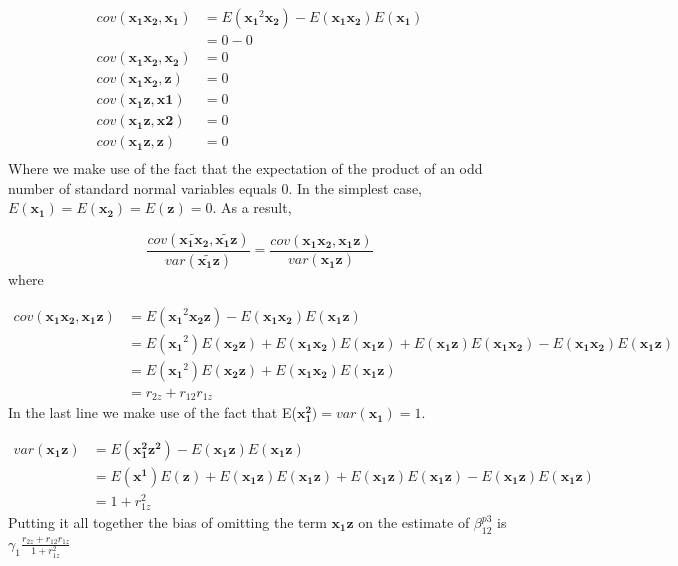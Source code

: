 \documentclass[12pt]{article}
\begin{document}
\begin{align*}
cov(\mathbf{x_1 x_2}, \mathbf{x_1}) &= E(\mathbf{x_1}^2 \mathbf{x_2}) - E(\mathbf{x_1 x_2}) E(\mathbf{x_1}) \\
&= 0 - 0 \\
cov(\mathbf{x_1 x_2}, \mathbf{x_2}) &= 0 \\
cov(\mathbf{x_1 x_2}, \mathbf{z}) &= 0 \\
cov(\mathbf{x_1 z}, \mathbf{x1}) &= 0 \\
cov(\mathbf{x_1 z}, \mathbf{x2}) &= 0 \\
cov(\mathbf{x_1 z}, \mathbf{z}) &= 0 \\
\end{align*}
Where we make use of the fact that the expectation of the product of an odd number of standard normal variables equals 0. In the simplest case, $E(\mathbf{x_1}) =  E(\mathbf{x_2}) = E(\mathbf{z}) = 0$.
As a result,

\begin{equation*}
\frac{cov(\widetilde{\mathbf{x_1 x_2}}, \widetilde{\mathbf{x_1 z}})}{var(\widetilde{\mathbf{x_1 z}})} =
\frac{cov(\mathbf{x_1 x_2}, \mathbf{x_1 z})}{var(\mathbf{x_1 z})} 
\end{equation*}
where 

\begin{align*}
cov(\mathbf{x_1 x_2}, \mathbf{x_1 z}) &= E(\mathbf{x_1}^2 \mathbf{x_2 z }) - E(\mathbf{x_1 x_2}) E(\mathbf{x_1 z}) \\
&= E(\mathbf{x_1}^2) E(\mathbf{x_2 z }) + E(\mathbf{x_1 x_2}) E(\mathbf{x_1 z}) + E(\mathbf{x_1 z}) E(\mathbf{x_1 x_2}) - E(\mathbf{x_1 x_2}) E(\mathbf{x_1 z}) \\
&= E(\mathbf{x_1}^2) E(\mathbf{x_2 z }) + E(\mathbf{x_1 x_2}) E(\mathbf{x_1 z}) \\
&= r_{2z} + r_{12} r_{1z}
\end{align*}
In the last line we make use of the fact that E($\mathbf{x_1^2}) = var(\mathbf{x_1}) = 1$.

\begin{align*}
	var(\mathbf{x_1 z}) &= E(\mathbf{x_1^2 z^2}) - E(\mathbf{x_1 z}) E(\mathbf{x_1 z}) \\
	&= E(\mathbf{x^1}) E(\mathbf{z}) +  E(\mathbf{x_1 z}) E(\mathbf{x_1 z}) + E(\mathbf{x_1 z}) E(\mathbf{x_1 z}) - E(\mathbf{x_1 z}) E(\mathbf{x_1 z}) \\
	&= 1 + r^2_{1z}
\end{align*}
Putting it all together the bias of omitting the term $\mathbf{x_1 z}$ on the estimate of $\beta^{p3}_{12}$ is  $\gamma_1 \frac{r_{2z} + r_{12} r_{1z}}{1 + r^2_{1z}}$
\end{document}
